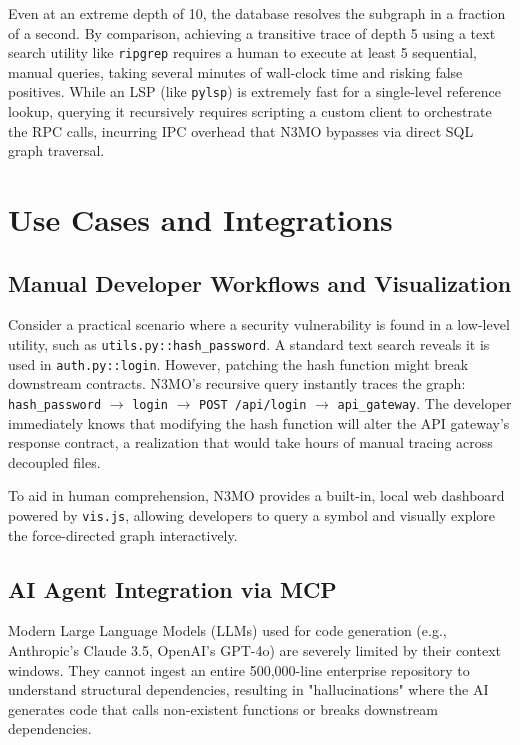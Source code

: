 \documentclass[conference]{IEEEtran}
\begin{document}
Even at an extreme depth of 10, the database resolves the subgraph in a fraction of a second. By comparison, achieving a transitive trace of depth 5 using a text search utility like \texttt{ripgrep} requires a human to execute at least 5 sequential, manual queries, taking several minutes of wall-clock time and risking false positives. While an LSP (like \texttt{pylsp}) is extremely fast for a single-level reference lookup, querying it recursively requires scripting a custom client to orchestrate the RPC calls, incurring IPC overhead that N3MO bypasses via direct SQL graph traversal.

\section{Use Cases and Integrations}

\subsection{Manual Developer Workflows and Visualization}
Consider a practical scenario where a security vulnerability is found in a low-level utility, such as \texttt{utils.py::hash\_password}. A standard text search reveals it is used in \texttt{auth.py::login}. However, patching the hash function might break downstream contracts. N3MO’s recursive query instantly traces the graph: \texttt{hash\_password} $\rightarrow$ \texttt{login} $\rightarrow$ \texttt{POST /api/login} $\rightarrow$ \texttt{api\_gateway}. The developer immediately knows that modifying the hash function will alter the API gateway's response contract, a realization that would take hours of manual tracing across decoupled files. 

To aid in human comprehension, N3MO provides a built-in, local web dashboard powered by \texttt{vis.js}, allowing developers to query a symbol and visually explore the force-directed graph interactively.

\subsection{AI Agent Integration via MCP}
Modern Large Language Models (LLMs) used for code generation (e.g., Anthropic's Claude 3.5, OpenAI's GPT-4o) are severely limited by their context windows. They cannot ingest an entire 500,000-line enterprise repository to understand structural dependencies, resulting in "hallucinations" where the AI generates code that calls non-existent functions or breaks downstream dependencies.
\end{document}
